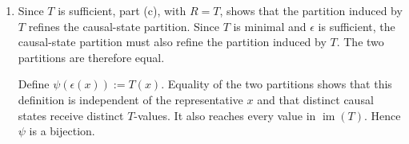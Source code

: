 \begin{solution}[ex:p2-2]
\begin{enumerate}
      \item Since $T$ is sufficient, part (c), with $R=T$, shows that the
        partition induced by $T$ refines the causal-state partition. Since
        $T$ is minimal and $\epsilon$ is sufficient, the causal-state
        partition must also refine the partition induced by $T$. The two
        partitions are therefore equal.

        Define $\psi(\epsilon(x)):=T(x)$. Equality of the two partitions shows
        that this definition is independent of the representative $x$ and
        that distinct causal states receive distinct $T$-values. It also
        reaches every value in $\operatorname{im}(T)$. Hence $\psi$ is a
        bijection.
    \end{enumerate}
\end{solution}

